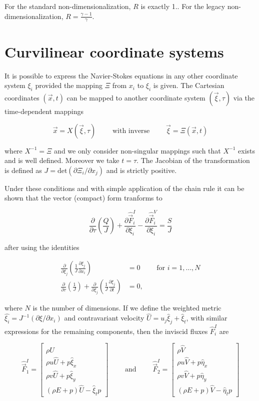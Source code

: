 For the standard non-\/dimensionalization, $R$ is exactly 1.. For the legacy non-\/dimensionalization, $R = \frac{\gamma-1}{\gamma}$.\hypertarget{theory_gridMetrics}{}\section{Curvilinear coordinate systems}\label{theory_gridMetrics}
It is possible to express the Navier-\/\+Stokes equations in any other coordinate system $\xi_i$ provided the mapping $\Xi$ from $x_i$ to $\xi_i$ is given. The Cartesian coordinates $(\vec{x},t)$ can be mapped to another coordinate system $(\vec{\xi},\tau)$ via the time-\/dependent mappings

\[ \vec{x} = {X}(\vec{\xi},\tau) \qquad \mbox{ with inverse } \qquad \vec{\xi} = \Xi(\vec{x},t) \]

where $X^{-1} = \Xi$ and we only consider non-\/singular mappings such that $X^{-1}$ exists and is well defined. Moreover we take $t = \tau$. The Jacobian of the transformation is defined as $J = \mathrm{det}(\partial \Xi_i/\partial x_j)$ and is strictly positive.

Under these conditions and with simple application of the chain rule it can be shown\cite{vinokur:1974} that the vector (compact) form tranforms to

\[ \frac{\partial}{\partial \tau}\left(\frac{Q}{J}\right) + \frac{\partial \hat{\vec{F}}^I_i}{\partial \xi_i} - \frac{\partial \hat{\vec{F}}^V_i}{\partial \xi_i}= \frac{S}{J} \]

after using the identities

\[ \begin{split} \frac{\partial}{\partial \xi_j}\left(\frac{1}{J}\frac{\partial \xi_j}{\partial x_i}\right) &= 0 \qquad \mbox{ for $i = 1, \dots, N$} \\ \frac{\partial}{\partial \tau}\left(\frac{1}{J}\right) + \frac{\partial}{\partial \xi_j}\left(\frac{1}{J}\frac{\partial \xi_j}{\partial t}\right) &= 0, \end{split} \]

where $N$ is the number of dimensions. If we define the weighted metric $\hat{\xi_i} = J^{-1}(\partial \xi/\partial x_i)$ and contravariant velocity $\hat{U} = u_j \hat{\xi}_j + \hat{\xi}_t$, with similar expressions for the remaining components, then the inviscid fluxes $\hat{F}^I_i$ are

\[ \hat{\vec{F}}^I_1 = \begin{bmatrix} \rho \hat{U} \\ \rho u \hat{U} + p\hat{\xi}_x \\ \rho v \hat{U} + p \hat{\xi}_y \\ (\rho E + p)\hat{U} - \hat{\xi}_t p \end{bmatrix}\qquad \mbox{ and } \qquad \hat{\vec{F}}^I_2 = \begin{bmatrix} \rho \hat{V} \\ \rho u \hat{V} + p\hat{\eta}_x \\ \rho v \hat{V} + p \hat{\eta}_y \\ (\rho E + p)\hat{V} - \hat{\eta}_t p \end{bmatrix} \]

